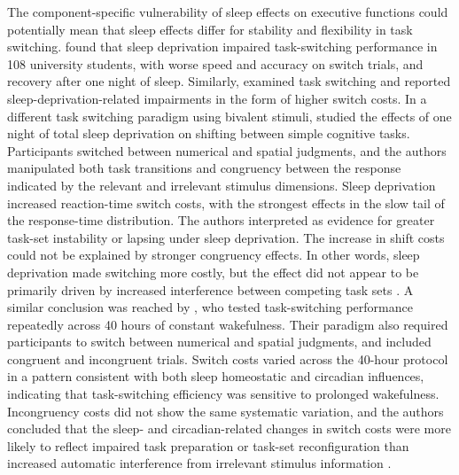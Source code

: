 \documentclass[12pt,a4paper]{report}
\begin{document}
The component-specific vulnerability of sleep effects on executive functions could potentially mean that sleep effects differ for stability and flexibility in task switching. \textcite{couyoumdjian2010switchingsleep} found that sleep deprivation impaired task-switching performance in 108 university students, with worse speed and accuracy on switch trials, and recovery after one night of sleep. Similarly, \textcite{slama2018sleepswitching} examined task switching and reported sleep-deprivation-related impairments in the form of higher switch costs. In a different task switching paradigm using bivalent stimuli, \textcite{heuer2004totalsleepdeprivation} studied the effects of one night of total sleep deprivation on shifting between simple cognitive tasks. Participants switched between numerical and spatial judgments, and the authors manipulated both task transitions and congruency between the response indicated by the relevant and irrelevant stimulus dimensions. Sleep deprivation increased reaction-time switch costs, with the strongest effects in the slow tail of the response-time distribution. The authors interpreted as evidence for greater task-set instability or lapsing under sleep deprivation. The increase in shift costs could not be explained by stronger congruency effects. In other words, sleep deprivation made switching more costly, but the effect did not appear to be primarily driven by increased interference between competing task sets \parencite{heuer2004totalsleepdeprivation}. A similar conclusion was reached by \textcite{bratzke2009constantwakefulness}, who tested task-switching performance repeatedly across 40 hours of constant wakefulness. Their paradigm also required participants to switch between numerical and spatial judgments, and included congruent and incongruent trials. Switch costs varied across the 40-hour protocol in a pattern consistent with both sleep homeostatic and circadian influences, indicating that task-switching efficiency was sensitive to prolonged wakefulness. Incongruency costs did not show the same systematic variation, and the authors concluded that the sleep- and circadian-related changes in switch costs were more likely to reflect impaired task preparation or task-set reconfiguration than increased automatic interference from irrelevant stimulus information \parencite{bratzke2009constantwakefulness}.
\end{document}

